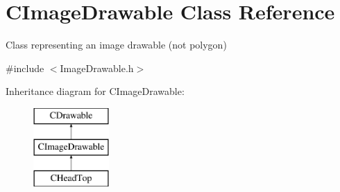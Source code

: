 \hypertarget{class_c_image_drawable}{\section{C\+Image\+Drawable Class Reference}
\label{class_c_image_drawable}
}


Class representing an image drawable (not polygon)  




{\ttfamily \#include $<$Image\+Drawable.\+h$>$}

Inheritance diagram for C\+Image\+Drawable\+:\begin{figure}[H]
\begin{center}
\leavevmode
\includegraphics[height=3.000000cm]{class_c_image_drawable}
\end{center}
\end{figure}
